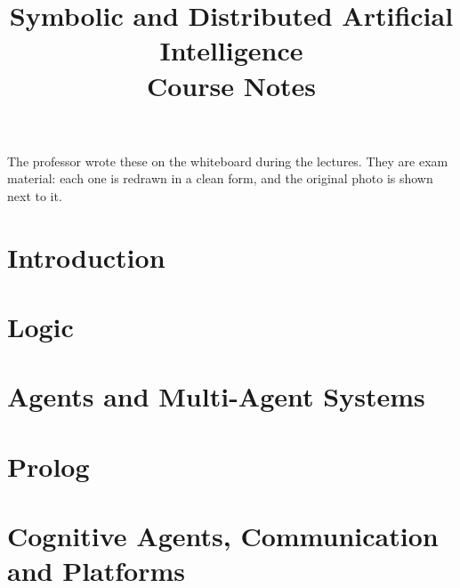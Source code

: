 \documentclass[12pt]{article}
\title{Symbolic and Distributed Artificial Intelligence\\[4pt]\large Course Notes}
\author{}
\date{}
\begin{document}
\maketitle
\tableofcontents
\newpage
{}
\noindent\small The professor wrote these on the whiteboard during the lectures. They are
exam material: each one is redrawn in a clean form, and the original photo is shown next to it.
\normalsize
\newpage

\part{Introduction}


\part{Logic}



\part{Agents and Multi-Agent Systems}




\part{Prolog}


\part{Cognitive Agents, Communication and Platforms}




\end{document}
